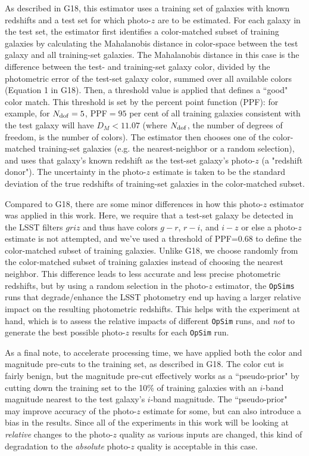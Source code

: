 As described in G18, this estimator uses a training set of galaxies with known redshifts and a test set for which photo-$z$ are to be estimated. For each galaxy in the test set, the estimator first identifies a color-matched subset of training galaxies by calculating the Mahalanobis distance in color-space between the test galaxy and all training-set galaxies. The Mahalanobis distance in this case is the difference between the test- and training-set galaxy color, divided by the photometric error of the test-set galaxy color, summed over all available colors (Equation 1 in G18). Then, a threshold value is applied that defines a ``good" color match. This threshold is set by the percent point function (PPF): for example, for $N_{\rm dof}=5$, PPF$=95$ per cent of all training galaxies consistent with the test galaxy will have $D_M < 11.07$ (where $N_{\rm dof}$, the number of degrees of freedom, is the number of colors). The estimator then chooses one of the color-matched training-set galaxies (e.g. the nearest-neighbor or a random selection), and uses that galaxy's known redshift as the test-set galaxy's photo-$z$ (a "redshift donor"). The uncertainty in the photo-$z$ estimate is taken to be the standard deviation of the true redshifts of training-set galaxies in the color-matched subset. 

Compared to G18, there are some minor differences in how this photo-$z$ estimator was applied in this work. Here, we require that a test-set galaxy be detected in the LSST filters $griz$ and thus have colors $g-r$, $r-i$, and $i-z$ or else a photo-$z$ estimate is not attempted, and we've used a threshold of PPF=$0.68$ to define the color-matched subset of training galaxies. Unlike G18, we choose randomly from the color-matched subset of training galaxies instead of choosing the nearest neighbor. This difference leads to less accurate and less precise photometric redshifts, but by using a random selection in the photo-$z$ estimator, the {\tt OpSims} runs that degrade/enhance the LSST photometry end up having a larger relative impact on the resulting photometric redshifts. This helps with the experiment at hand, which is to assess the relative impacts of different {\tt OpSim} runs, and {\em not} to generate the best possible photo-$z$ results for each {\tt OpSim} run.

As a final note, to accelerate processing time, we have applied both the color and magnitude pre-cuts to the training set, as described in G18. The color cut is fairly benign, but the magnitude pre-cut effectively works as a ``pseudo-prior" by cutting down the training set to the 10\% of training galaxies with an $i$-band magnitude nearest to the test galaxy's $i$-band magnitude. The ``pseudo-prior" may improve accuracy of the photo-$z$ estimate for some, but can also introduce a bias in the results. Since all of the experiments in this work will be looking at {\it relative} changes to the photo-$z$ quality as various inputs are changed, this kind of degradation to the {\it absolute} photo-$z$ quality is acceptable in this case.


